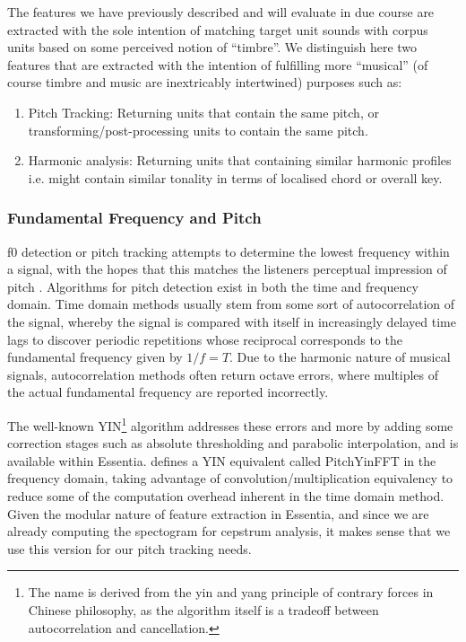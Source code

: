 {{{{The features we have previously described and will evaluate in due course are extracted with the sole intention of matching target unit sounds with corpus units based on some perceived notion of ``timbre''. We distinguish here two features that are extracted with the intention of fulfilling more ``musical'' (of course timbre and music are inextricably intertwined) purposes such as:

\begin{enumerate}
  \item Pitch Tracking: Returning units that contain the same pitch, or transforming/post-processing units to contain the same pitch.
  \item Harmonic analysis: Returning units that containing similar harmonic profiles i.e. might contain similar tonality in terms of localised chord or overall key.
\end{enumerate}


\subsubsection{Fundamental Frequency and Pitch}

\label{sec:yin}

\acrfull{f0} detection or pitch tracking attempts to determine the lowest frequency within a signal, with the hopes that this matches the listeners perceptual impression of pitch \citep{Gerhard2003}. Algorithms for pitch detection exist in both the time and frequency domain. Time domain methods usually stem from some sort of autocorrelation of the signal, whereby the signal is compared with itself in increasingly delayed time lags to discover periodic repetitions whose reciprocal corresponds to the fundamental frequency given by $1/f = T$. Due to the harmonic nature of musical signals, autocorrelation methods often return octave errors, where multiples of the actual fundamental frequency are reported incorrectly.

The well-known YIN\footnote{The name is derived from the yin and yang principle of contrary forces in Chinese philosophy, as the algorithm itself is a tradeoff between autocorrelation and cancellation.} algorithm \citep{DeCheveigne2002} addresses these errors and more by adding some correction stages such as absolute thresholding and parabolic interpolation, and is available within Essentia. \cite{Brossier2006} defines a YIN equivalent called PitchYinFFT in the frequency domain, taking advantage of convolution/multiplication equivalency to reduce some of the computation overhead inherent in the time domain method. Given the modular nature of feature extraction in Essentia, and since we are already computing the spectogram for cepstrum analysis, it makes sense that we use this version for our pitch tracking needs.

}}}}
